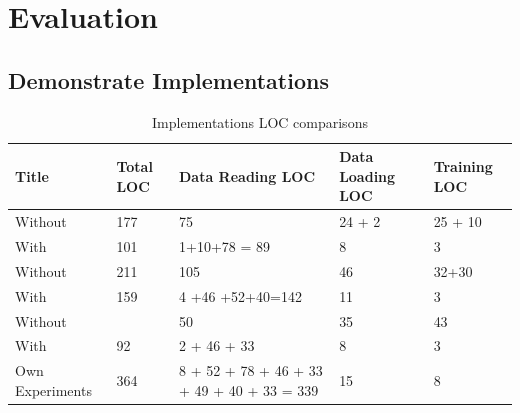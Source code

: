 \chapter{Evaluation}

\section{Demonstrate Implementations} \label{evaluation:demonstrations}
% 



\begin{table}[ht]
	\caption{Implementations LOC comparisons} %
	\centering %
	\begin{tabular}{p{}p{}p{}p{}p{}} %
		\hline\hline %
		Title & Total LOC  & Data Reading LOC & Data Loading LOC & Training LOC  \\ [0.5ex] %
		\hline %
		\citet{park2020augmenting} Without & 177  & 75 & 24 + 2 & 25 + 10  \\ \hline
		\citet{park2020augmenting} With & 101 & 1+10+78 = 89 & 8 & 3  \\ \hline
		\citet{georgiev2017low} Without & 211  & 105 & 46 & 32+30   \\ \hline
		\citet{georgiev2017low} With & 159 & 4 +46 +52+40=142 & 11 & 3 \\ \hline
		\citet{xu2019multi} Without &  & 50 & 35 & 43   \\ \hline
		\citet{xu2019multi} With & 92 & 2 + 46 + 33 & 8 & 3  \\ \hline
		Own Experiments & 364 & 8 + 52 + 78 + 46 + 33 + 49 + 40 + 33 = 339 & 15 & 8  \\ \hline
	\end{tabular}
	\label{table:LOC} %
\end{table}

